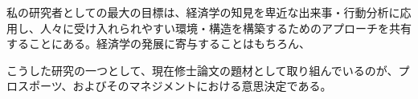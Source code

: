 \documentclass[dvipdfmx, 12pt]{jsarticle}
\begin{document}
私の研究者としての最大の目標は、経済学の知見を卑近な出来事・行動分析に応用し、人々に受け入れられやすい環境・構造を構築するためのアプローチを共有することにある。経済学の発展に寄与することはもちろん、

こうした研究の一つとして、現在修士論文の題材として取り組んでいるのが、プロスポーツ、およびそのマネジメントにおける意思決定である。
\end{document}
